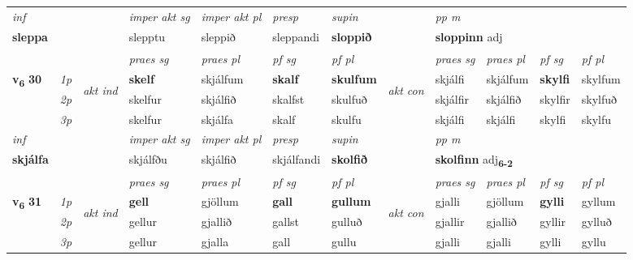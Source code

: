 \begin{longtable}[l]{X>{\footnotesize\itshape}llXXXXlXXXX}
   {\textit{inf}} & &  & \textit{imper akt sg} & \textit{imper akt pl}   & \textit{presp} & \textit{supin}  && \textit{pp m} \\*
  {\textbf{sleppa}} & && slepptu  & sleppið   & sleppandi &  \textbf{sloppið}  && \multicolumn{2}{l}{\textbf{sloppinn} adj\textbf{\textsubscript{}}} \\*

\midrule

 & &   & \textit{praes sg}  & \textit{praes pl}    & \textit{ pf sg} & \textit{pf pl} & & \textit{praes sg}  & \textit{praes pl}    & \textit{pf sg} & \textit{pf pl }  \\ \cmidrule{4-7} \cmidrule{9-12}
 \multirow{2}{*}{{{\textbf{v{\textsubscript{6}}} \Large{\textbf{30}}}}}  & 1p & \multirow{3}{*}{\begin{turn}{90}\textit{akt ind}\end{turn}} & \textbf{skelf} & skjálfum & \textbf{skalf} & \textbf{skulfum} & \multirow{3}{*}{\begin{turn}{90}\textit{akt con}\end{turn}} &skjálfi & skjálfum & \textbf{skylfi} & skylfum\\*
 & 2p &  &  skelfur  & skjálfið & skalfst & skulfuð & & skjálfir & skjálfið & skylfir & skylfuð \\*
 & 3p &  & skelfur & skjálfa & skalf & skulfu & & skjálfi & skjálfi& skylfi & skylfu \\*
\cmidrule{4-7} \cmidrule{9-12}

   {\textit{inf}} & &  & \textit{imper akt sg} & \textit{imper akt pl}   & \textit{presp} & \textit{supin}  && \textit{pp m} \\*
  {\textbf{skjálfa}} & && skjálfðu  & skjálfið   & skjálfandi &  \textbf{skolfið}  && \multicolumn{2}{l}{\textbf{skolfinn} adj\textbf{\textsubscript{6-2}}} \\*

\midrule

 & &   & \textit{praes sg}  & \textit{praes pl}    & \textit{ pf sg} & \textit{pf pl} & & \textit{praes sg}  & \textit{praes pl}    & \textit{pf sg} & \textit{pf pl }  \\ \cmidrule{4-7} \cmidrule{9-12}
 \multirow{2}{*}{{{\textbf{v{\textsubscript{6}}} \Large{\textbf{31}}}}}  & 1p & \multirow{3}{*}{\begin{turn}{90}\textit{akt ind}\end{turn}} & \textbf{gell} & gjöllum & \textbf{gall} & \textbf{gullum} & \multirow{3}{*}{\begin{turn}{90}\textit{akt con}\end{turn}} &gjalli & gjöllum & \textbf{gylli} & gyllum\\*
 & 2p &  &  gellur  & gjallið & gallst & gulluð & & gjallir & gjallið & gyllir & gylluð \\*
 & 3p &  & gellur & gjalla & gall & gullu & & gjalli & gjalli& gylli & gyllu \\*
\cmidrule{4-7} \cmidrule{9-12}


\end{longtable}
